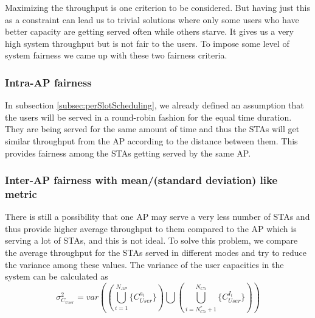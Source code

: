 




Maximizing the throughput is one criterion to be considered. But having just this as a constraint can lead us to trivial solutions where only some users who have better capacity are getting served often while others starve. It gives us a very high system throughput but is not fair to the users. To impose some level of system fairness we came up with these two fairness criteria.

\subsubsection{Intra-AP fairness}
In subsection \ref{subsec:perSlotScheduling}, we already defined an assumption that the users will be served in a round-robin fashion for the equal time duration.
They are being served for the same amount of time and thus the STAs will get similar throughput from the AP according to the distance between them. This provides fairness among the STAs getting served by the same AP.

\subsubsection{Inter-AP fairness with mean/(standard deviation) like metric}
There is still a possibility that one AP may serve a very less number of STAs and thus provide higher average throughput to them compared to the AP which is serving a lot of STAs, and this is not ideal. To solve this problem, we compare the average throughput for the STAs served in different modes and try to reduce the variance among these values. The variance of the user capacities in the system can be calculated as
\begin{equation}
    \sigma_{C_{User}}^2 = var \left( \left( \bigcup\limits_{i = 1}^{N_{AP}} \big\{ C_{User}^{a_i} \big\} \right) \bigcup \left(
    \bigcup\limits_{i = N_{Ch}^* + 1}^{N_{Ch}} \big\{ C_{User}^{I_i} \big\} \right) \right)
\end{equation}

